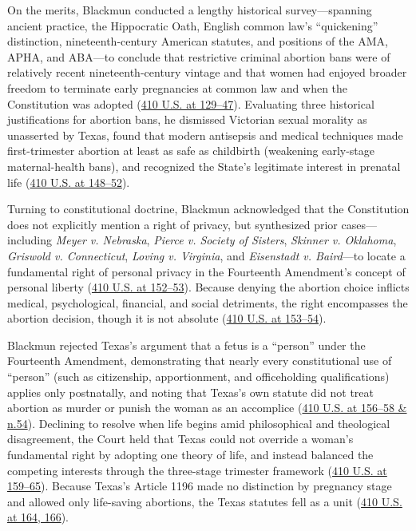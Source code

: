\documentclass[12pt]{article}
\begin{document}
On the merits, Blackmun conducted a lengthy historical survey---spanning ancient practice, the Hippocratic Oath, English common law's ``quickening'' distinction, nineteenth-century American statutes, and positions of the AMA, APHA, and ABA---to conclude that restrictive criminal abortion bans were of relatively recent nineteenth-century vintage and that women had enjoyed broader freedom to terminate early pregnancies at common law and when the Constitution was adopted (\href{https://supreme.justia.com/cases/federal/us/410/113/}{410 U.S. at 129--47}). Evaluating three historical justifications for abortion bans, he dismissed Victorian sexual morality as unasserted by Texas, found that modern antisepsis and medical techniques made first-trimester abortion at least as safe as childbirth (weakening early-stage maternal-health bans), and recognized the State's legitimate interest in prenatal life (\href{https://supreme.justia.com/cases/federal/us/410/113/}{410 U.S. at 148--52}).

Turning to constitutional doctrine, Blackmun acknowledged that the Constitution does not explicitly mention a right of privacy, but synthesized prior cases---including \textit{Meyer v. Nebraska}, \textit{Pierce v. Society of Sisters}, \textit{Skinner v. Oklahoma}, \textit{Griswold v. Connecticut}, \textit{Loving v. Virginia}, and \textit{Eisenstadt v. Baird}---to locate a fundamental right of personal privacy in the Fourteenth Amendment's concept of personal liberty (\href{https://supreme.justia.com/cases/federal/us/410/113/}{410 U.S. at 152--53}). Because denying the abortion choice inflicts medical, psychological, financial, and social detriments, the right encompasses the abortion decision, though it is not absolute (\href{https://supreme.justia.com/cases/federal/us/410/113/}{410 U.S. at 153--54}).

Blackmun rejected Texas's argument that a fetus is a ``person'' under the Fourteenth Amendment, demonstrating that nearly every constitutional use of ``person'' (such as citizenship, apportionment, and officeholding qualifications) applies only postnatally, and noting that Texas's own statute did not treat abortion as murder or punish the woman as an accomplice (\href{https://supreme.justia.com/cases/federal/us/410/113/}{410 U.S. at 156--58 \& n.54}). Declining to resolve when life begins amid philosophical and theological disagreement, the Court held that Texas could not override a woman's fundamental right by adopting one theory of life, and instead balanced the competing interests through the three-stage trimester framework (\href{https://supreme.justia.com/cases/federal/us/410/113/}{410 U.S. at 159--65}). Because Texas's Article 1196 made no distinction by pregnancy stage and allowed only life-saving abortions, the Texas statutes fell as a unit (\href{https://supreme.justia.com/cases/federal/us/410/113/}{410 U.S. at 164, 166}).
\end{document}
